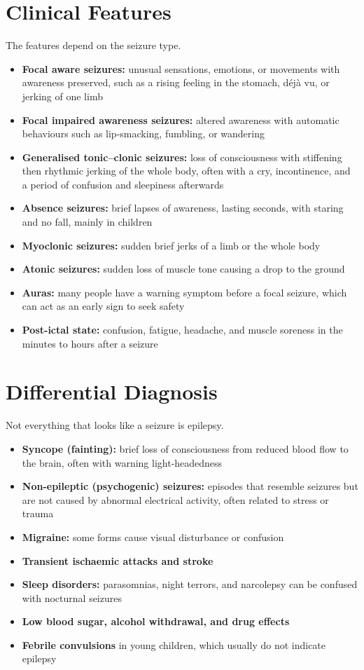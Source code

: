 \section*{Clinical Features}
The features depend on the seizure type.
\begin{itemize}
    \item \textbf{Focal aware seizures:} unusual sensations, emotions, or movements with awareness preserved, such as a rising feeling in the stomach, déjà vu, or jerking of one limb
    \item \textbf{Focal impaired awareness seizures:} altered awareness with automatic behaviours such as lip-smacking, fumbling, or wandering
    \item \textbf{Generalised tonic--clonic seizures:} loss of consciousness with stiffening then rhythmic jerking of the whole body, often with a cry, incontinence, and a period of confusion and sleepiness afterwards
    \item \textbf{Absence seizures:} brief lapses of awareness, lasting seconds, with staring and no fall, mainly in children
    \item \textbf{Myoclonic seizures:} sudden brief jerks of a limb or the whole body
    \item \textbf{Atonic seizures:} sudden loss of muscle tone causing a drop to the ground
    \item \textbf{Auras:} many people have a warning symptom before a focal seizure, which can act as an early sign to seek safety
    \item \textbf{Post-ictal state:} confusion, fatigue, headache, and muscle soreness in the minutes to hours after a seizure
\end{itemize}

\section*{Differential Diagnosis}
Not everything that looks like a seizure is epilepsy.
\begin{itemize}
    \item \textbf{Syncope (fainting):} brief loss of consciousness from reduced blood flow to the brain, often with warning light-headedness
    \item \textbf{Non-epileptic (psychogenic) seizures:} episodes that resemble seizures but are not caused by abnormal electrical activity, often related to stress or trauma
    \item \textbf{Migraine:} some forms cause visual disturbance or confusion
    \item \textbf{Transient ischaemic attacks and stroke}
    \item \textbf{Sleep disorders:} parasomnias, night terrors, and narcolepsy can be confused with nocturnal seizures
    \item \textbf{Low blood sugar, alcohol withdrawal, and drug effects}
    \item \textbf{Febrile convulsions} in young children, which usually do not indicate epilepsy
\end{itemize}

